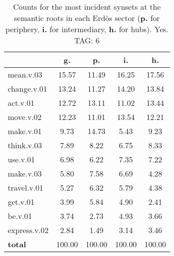 \begin{table}[h!]
\begin{center}
\begin{tabular}{| l | c | c | c | c |}\hline
 & g. & p. & i. & h. \\\hline
mean.v.03 & 15.57  & 11.49  & 16.25  & 17.56 \\\hline
change.v.01 & 13.24  & 11.27  & 14.20  & 13.84 \\\hline
act.v.01 & 12.72  & 13.11  & 11.02  & 13.44 \\\hline
move.v.02 & 12.23  & 11.01  & 13.54  & 12.21 \\\hline
make.v.01 & 9.73  & 14.73  & 5.43  & 9.23 \\\hline
think.v.03 & 7.89  & 8.22  & 6.75  & 8.33 \\\hline
use.v.01 & 6.98  & 6.22  & 7.35  & 7.22 \\\hline
make.v.03 & 5.80  & 7.58  & 6.69  & 4.28 \\\hline
travel.v.01 & 5.27  & 6.32  & 5.79  & 4.38 \\\hline
get.v.01 & 3.99  & 5.84  & 4.90  & 2.41 \\\hline
be.v.01 & 3.74  & 2.73  & 4.93  & 3.66 \\\hline
express.v.02 & 2.84  & 1.49  & 3.14  & 3.46 \\\hline
{{\bf total}} & 100.00  & 100.00  & 100.00  & 100.00 \\\hline
\end{tabular}
\caption{Counts for the most incident synsets at the semantic roots in each Erd\"os sector ({\bf p.} for periphery, {\bf i.} for intermediary, {\bf h.} for hubs). Yes. TAG: 6}
\end{center}
\end{table}